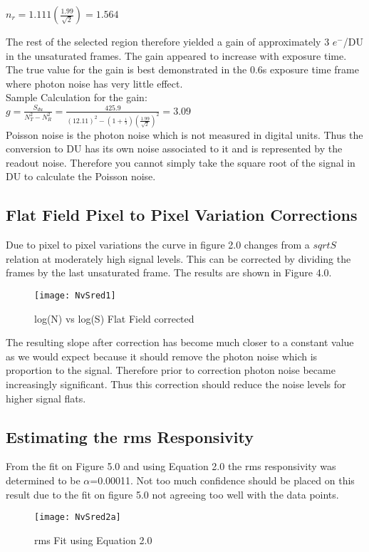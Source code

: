 \documentclass{article}
\begin{document}
$n_r=1.111(\frac{1.99}{\sqrt{2}})=1.564$

The rest of the selected region therefore yielded a gain of approximately 3 $e^-$/DU in the unsaturated frames. The gain appeared to increase with exposure time. The true value for the gain is best demonstrated in the 0.6s exposure time frame where photon noise has very little effect.\\

Sample Calculation for the gain:\\

$g = \frac{S_{du}}{N_T^2 - N_R^2} = \frac{425.9}{(12.11)^2-(1+\frac{_1}{^9})(\frac{1.99}{\sqrt{2}})^2} = 3.09$\\


Poisson noise is the photon noise which is not measured in digital units. Thus the conversion to DU has its own noise associated to it and is represented by the readout noise. Therefore you cannot simply take the square root of the signal in DU to calculate the Poisson noise.

\subsection{Flat Field Pixel to Pixel Variation Corrections}
Due to pixel to pixel variations the curve in figure 2.0 changes from a $sqrt{S}$ relation at moderately high signal levels. This can be corrected by dividing the frames by the last unsaturated frame. The results are shown in Figure 4.0.\\

\begin{figure}
\texttt{[image: NvSred1]} %
\caption{log(N) vs log(S) Flat Field corrected}
\end{figure}

The resulting slope after correction has become much closer to a constant value as we would expect because it should remove the photon noise which is proportion to the signal. Therefore prior to correction photon noise became increasingly significant. Thus this correction should reduce the noise levels for higher signal flats.

\subsection{Estimating the rms Responsivity}
From the fit on Figure 5.0 and using Equation 2.0 the rms responsivity was determined to be $\alpha$=0.00011. Not too much confidence should be placed on this result due to the fit on figure 5.0 not agreeing too well with the data points.\\
\begin{figure}
\texttt{[image: NvSred2a]} %
\caption{rms Fit using Equation 2.0}
\end{figure}
\end{document}
